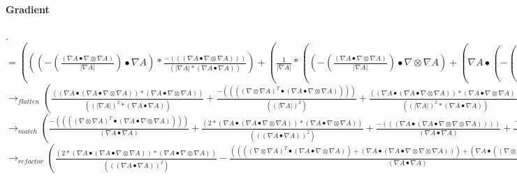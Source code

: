 \documentclass{article}
\begin{document}
 \paragraph{Gradient}.\\
$= (((-( \frac{( \nabla A \bullet  \nabla  \otimes  \nabla A)}{| \nabla A|}) \bullet  \nabla A)* \frac{-((( \nabla A \bullet  \nabla  \otimes  \nabla A)))}{(| \nabla A|*( \nabla A \bullet  \nabla A))})+( \frac{1}{| \nabla A|}*((-( \frac{( \nabla A \bullet  \nabla  \otimes  \nabla A)}{| \nabla A|}) \bullet  \nabla  \otimes  \nabla A)+( \nabla A \bullet (-( \frac{((| \nabla A|*((( \nabla A \bullet  \nabla  \otimes  \nabla  \otimes  \nabla A))^T+((( \nabla  \otimes  \nabla A)^T \bullet  \nabla  \otimes  \nabla A))^T))-(( \frac{( \nabla A \bullet  \nabla  \otimes  \nabla A)}{| \nabla A|}*( \nabla A \bullet  \nabla  \otimes  \nabla A))))}{( \nabla A \bullet  \nabla A)}))^T))))$
 \\
\newline $\rightarrow_{flatten}( \frac{(( \nabla A \bullet ( \nabla A \bullet  \nabla  \otimes  \nabla A))*( \nabla A \bullet  \nabla  \otimes  \nabla A))}{((| \nabla A|)^2*( \nabla A \bullet  \nabla A))}+ \frac{-(((( \nabla  \otimes  \nabla A)^T \bullet ( \nabla A \bullet  \nabla  \otimes  \nabla A))))}{((| \nabla A|)^2)}+ \frac{(( \nabla A \bullet ( \nabla A \bullet  \nabla  \otimes  \nabla A))*( \nabla A \bullet  \nabla  \otimes  \nabla A))}{((| \nabla A|)^2*( \nabla A \bullet  \nabla A))}+ \frac{-((| \nabla A|*( \nabla A \bullet ( \nabla A \bullet  \nabla  \otimes  \nabla  \otimes  \nabla A))))}{(| \nabla A|*( \nabla A \bullet  \nabla A))}+ \frac{-((| \nabla A|*( \nabla A \bullet (( \nabla  \otimes  \nabla A)^T \bullet  \nabla  \otimes  \nabla A))))}{(| \nabla A|*( \nabla A \bullet  \nabla A))})$\\
\newline $\rightarrow_{match}( \frac{-(((( \nabla  \otimes  \nabla A)^T \bullet ( \nabla A \bullet  \nabla  \otimes  \nabla A))))}{( \nabla A \bullet  \nabla A)}+ \frac{(2*( \nabla A \bullet ( \nabla A \bullet  \nabla  \otimes  \nabla A))*( \nabla A \bullet  \nabla  \otimes  \nabla A))}{((( \nabla A \bullet  \nabla A))^2)}+ \frac{-((( \nabla A \bullet ( \nabla A \bullet  \nabla  \otimes  \nabla  \otimes  \nabla A))))}{( \nabla A \bullet  \nabla A)}+ \frac{-((( \nabla A \bullet (( \nabla  \otimes  \nabla A)^T \bullet  \nabla  \otimes  \nabla A))))}{( \nabla A \bullet  \nabla A)})$\\
\newline $\rightarrow_{refactor}( \frac{(2*( \nabla A \bullet ( \nabla A \bullet  \nabla  \otimes  \nabla A))*( \nabla A \bullet  \nabla  \otimes  \nabla A))}{((( \nabla A \bullet  \nabla A))^2)}- \frac{(((( \nabla  \otimes  \nabla A)^T \bullet ( \nabla A \bullet  \nabla  \otimes  \nabla A))+( \nabla A \bullet ( \nabla A \bullet  \nabla  \otimes  \nabla  \otimes  \nabla A)))+( \nabla A \bullet (( \nabla  \otimes  \nabla A)^T \bullet  \nabla  \otimes  \nabla A)))}{( \nabla A \bullet  \nabla A)})$\\
\end{document}
